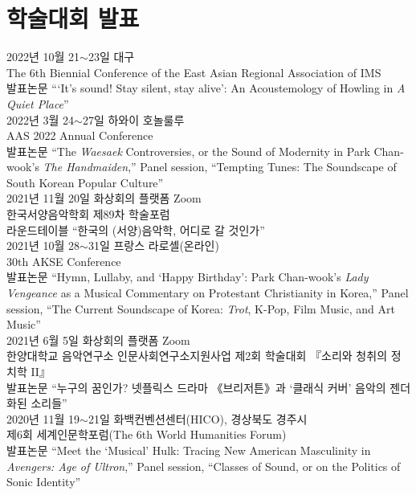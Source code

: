 \documentclass[dvipdfmx,a4paper]{article}
\begin{document}
  \section*{\normalsize 학술대회 발표}
  
  \noindent 2022년 10월 21$\sim$23일 대구\\    
  The 6th Biennial Conference of the East Asian Regional Association of IMS\\
  발표논문 “‘It’s sound! Stay silent, stay alive’: An Acoustemology of Howling in \textit{A Quiet Place}”\\
  
  \noindent 2022년 3월 24$\sim$27일 하와이 호놀룰루\\
  AAS 2022 Annual Conference\\
  발표논문 “The \textit{Waesaek} Controversies, or the Sound of Modernity in Park Chan-wook’s \textit{The Handmaiden},” Panel session, “Tempting Tunes: The Soundscape of South Korean Popular Culture”\\
  
  \noindent 2021년 11월 20일 화상회의 플랫폼 Zoom\\
  한국서양음악학회 제89차 학술포럼\\
  라운드테이블 ``한국의 (서양)음악학, 어디로 갈 것인가''\\
  
  \noindent 2021년 10월 28$\sim$31일 프랑스 라로셸(온라인)\\
  30th AKSE Conference\\
  발표논문 “Hymn, Lullaby, and ‘Happy Birthday’: Park Chan-wook’s \textit{Lady Vengeance} as a Musical Commentary on Protestant Christianity in Korea,” Panel session, “The Current Soundscape of Korea: \textit{Trot}, K-Pop, Film Music, and Art Music”\\
  
  \noindent 2021년 6월 5일 화상회의 플랫폼 Zoom\\
  한양대학교 음악연구소 인문사회연구소지원사업 제2회 학술대회 『소리와 청취의 정치학 II』\\
  발표논문 “누구의 꿈인가? 넷플릭스 드라마 《브리저튼》과 ‘클래식 커버’ 음악의 젠더화된 소리들”\\
  
  \noindent 2020년 11월 19$\sim$21일 화백컨벤션센터(HICO), 경상북도 경주시\\
  제6회 세계인문학포럼(The 6th World Humanities Forum)\\
  발표논문 “Meet the ‘Musical’ Hulk: Tracing New American Masculinity in \textit{Avengers: Age of Ultron},” Panel session, “Classes of Sound, or on the Politics of Sonic Identity”\\
  
\end{document}
